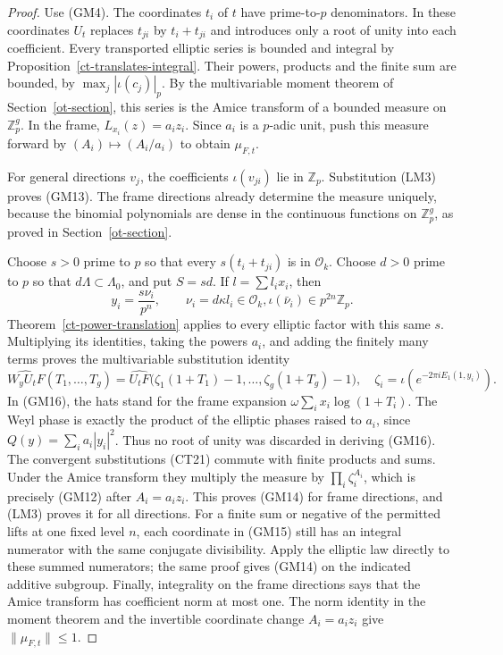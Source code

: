 \begin{proof}
Use (GM4).  The coordinates $t_i$ of $t$ have prime-to-$p$
denominators.  In these coordinates $U_t$ replaces $t_{ji}$
by $t_i+t_{ji}$ and introduces only a root of unity into each
coefficient.  Every transported elliptic series is bounded
and integral by Proposition~\ref{ct-translates-integral}.
Their powers, products and the finite sum are bounded, by
$\max_j|\iota(c_j)|_p$.  By the multivariable moment theorem
of Section~\ref{ot-section}, this series is the Amice
transform of a bounded measure on $\mathbb Z_p^g$.
In the frame, $L_{x_i}(z)=a_i z_i$.  Since $a_i$ is a
$p$-adic unit, push this measure forward by
$(A_i)\mapsto(A_i/a_i)$ to obtain $\mu_{F,t}$.

For general directions $v_j$, the coefficients $\iota(v_{ji})$
lie in $\mathbb Z_p$.  Substitution (LM3) proves (GM13).
The frame directions already determine the measure uniquely,
because the binomial polynomials are dense in the continuous
functions on $\mathbb Z_p^g$, as proved in
Section~\ref{ot-section}.

Choose $s>0$ prime to $p$ so that every
$s(t_i+t_{ji})$ is in $\mathcal O_k$.  Choose $d>0$ prime
to $p$ so that $d\Lambda\subset\Lambda_0$, and put $S=sd$.
If $l=\sum l_ix_i$, then
\[
          y_i=\frac{s\nu_i}{p^n},\qquad
          \nu_i=d\kappa l_i\in\mathcal O_k,
                      \iota(\bar\nu_i)\in p^{2n}\mathbb Z_p.
                                                               \tag{GM15}
\]
Theorem~\ref{ct-power-translation} applies to every elliptic
factor with this same $s$.  Multiplying its identities,
taking the powers $a_i$, and adding the finitely many terms
proves the multivariable substitution identity
\[
      \widehat{W_yU_tF}(T_1,\ldots,T_g)
          =\widehat{U_tF}\bigl(\zeta_1(1+T_1)-1,
                         \ldots,\zeta_g(1+T_g)-1\bigr),
 \quad \zeta_i=\iota(e^{-2\pi iE_1(1,y_i)}).              \tag{GM16}
\]
In (GM16), the hats stand for the frame expansion
$\omega\sum_i x_i\log(1+T_i)$.
The Weyl phase is exactly the product of the elliptic phases
raised to $a_i$, since $Q(y)=\sum_i a_i|y_i|^2$.
Thus no root of unity was discarded in deriving (GM16).
The convergent substitutions (CT21) commute with finite
products and sums.  Under the Amice transform they multiply
the measure by $\prod_i\zeta_i^{A_i}$, which is precisely
(GM12) after $A_i=a_i z_i$.  This proves (GM14) for frame
directions, and (LM3) proves it for all directions.
For a finite sum or negative of the permitted lifts at one
fixed level $n$, each
coordinate in (GM15) still has an integral numerator with the
same conjugate divisibility.  Apply the elliptic law directly
to these summed numerators; the same proof gives (GM14) on
the indicated additive subgroup.
Finally, integrality on the frame directions says that the
Amice transform has coefficient norm at most one.  The norm
identity in the moment theorem and the invertible coordinate
change $A_i=a_i z_i$ give $\|\mu_{F,t}\|\le1$.
\end{proof}

